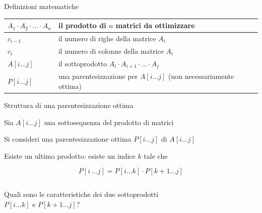\begin{frame}{Definizioni matematiche}

\begin{tabular}{|P{3cm}|P{8cm}|}
\hline
$A_1 \cdot A_2 \cdot \ldots \cdot A_n$  & il prodotto di $n$ matrici da ottimizzare \\\hline
$c_{i-1}$ & il numero di righe della matrice $A_i$ \\\hline
$c_i$ & il numero di colonne della matrice $A_i$ \\\hline
$A[i \ldots j]$ & il sottoprodotto $A_i \cdot A_{i+1 }\cdot \ldots \cdot A_j$ \\\hline
$P[i \ldots j]$ & una parentesizzazione per $A[i \ldots j]$ \newline(non necessariamente ottima) \\\hline
\end{tabular}
\end{frame}

\begin{frame}{Struttura di una parentesizzazione ottima}
    
\vspace{-9pt}
\begin{myboxtitle}[Osservazioni]
\BIL
\item Sia $A[i \ldots j]$ una sottosequenza del prodotto di matrici
\item Si consideri una parentesizzazione ottima $P[i \ldots j]$ di $A[i \ldots j]$
\item Esiste un \alert{ultimo prodotto}: esiste un indice $k$ tale che 

\[
  P[i\ \ldots j] = P[i \ldots k] \cdot  P[k+1 \ldots j]
\]
\EIL
\end{myboxtitle}

\begin{columns}[T]
\begin{myboxtitle}[Domanda]
Quali sono le caratteristiche dei due sottoprodotti\\ $P[i \ldots k]$ e $P[k+1 \ldots j]$?
\end{myboxtitle}
\vspace{-9pt}
\end{columns}

\end{frame}

